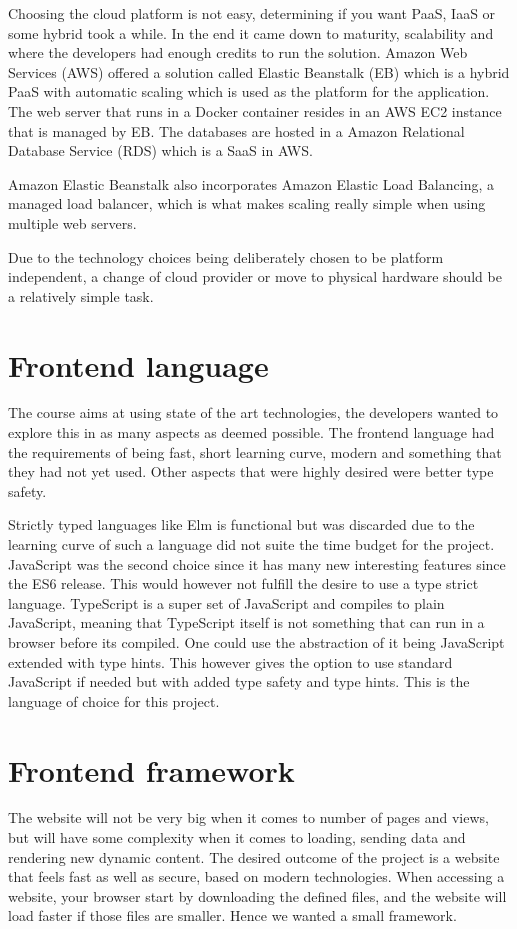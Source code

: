 \documentclass[12pt,a4paper]{report}
\begin{document}
Choosing the cloud platform is not easy, determining if you want PaaS, IaaS or some hybrid took a while. In the end it came down to maturity, scalability and where the developers had enough credits to run the solution. Amazon Web Services (AWS) offered a solution called Elastic Beanstalk (EB)\cite{what-is-eb} which is a hybrid PaaS with automatic scaling which is used as the platform for the application. The web server that runs in a Docker container resides in an AWS EC2 instance that is managed by EB. The databases are hosted in a Amazon Relational Database Service (RDS) which is a SaaS in AWS.

Amazon Elastic Beanstalk also incorporates Amazon Elastic Load Balancing, a managed load balancer, which is what makes scaling really simple when using multiple web servers.

Due to the technology choices being deliberately chosen to be platform independent, a change of cloud provider or move to physical hardware should be a relatively simple task.

\section{Frontend language}
The course aims at using state of the art technologies, the developers wanted to explore this in as many aspects as deemed possible. The frontend language had the requirements of being fast, short learning curve, modern and something that they had not yet used. Other aspects that were highly desired were better type safety.

Strictly typed languages like Elm is functional but was discarded due to the learning curve of such a language did not suite the time budget for the project.
JavaScript was the second choice since it has many new interesting features since the ES6 release. This would however not fulfill the desire to use a type strict language.
TypeScript\cite{typescript} is a super set of JavaScript and compiles to plain JavaScript, meaning that TypeScript itself is not something that can run in a browser before its compiled. One could use the abstraction of it being JavaScript extended with type hints. This however gives the option to use standard JavaScript if needed but with added type safety and type hints. This is the language of choice for this project.

\newpage
\section{Frontend framework}
The website will not be very big when it comes to number of pages and views, but will have some complexity when it comes to loading, sending data and rendering new dynamic content.
The desired outcome of the project is a website that feels fast as well as secure, based on modern technologies. When accessing a website, your browser start by downloading the defined files, and the website will load faster if those files are smaller. Hence we wanted a small framework.
\end{document}

